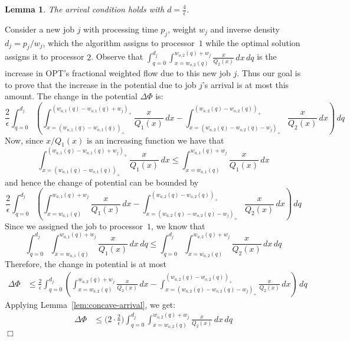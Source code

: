 \documentclass[11pt]{article}
\newtheorem{lemma}{Lemma}[section]
\newenvironment{proof}{\vspace{-0.15in}\noindent{\bf Proof:}}{\hspace*{\fill}$\Box$\par}
\newcommand{\opt}{\textrm{\sc OPT}\xspace}
\newcommand{\tsty}{}
\newcommand{\const}{\frac{2}{\epsilon}}
\begin{document}
\begin{lemma}
  \label{lem:arrival-wtd}
  The arrival condition holds with $d = \frac{4}{\epsilon}$.
\end{lemma}
\begin{proof}
Consider a new job $j$ with processing time $p_j$, weight $w_j$ and
inverse density $d_j = p_j/w_j$, which the algorithm assigns to
processor~$1$ while the optimal solution assigns it to processor $2$.
Observe that $\int_{q=0}^{d_j}
\int_{x=w_{o,2}(q)}^{w_{o,2}(q) + w_j} \frac{ x}{Q_2( x)} \,dx \,dq $ is
the increase in \opt's fractional weighted flow due to this new job $j$.
Thus our goal is to prove that the increase in the potential due to
job $j$'s arrival is at most this amount.
The change in the potential $\Delta \Phi$ is:
\begin{equation}
  \label{eq:phi1-wtd}
\nonumber \tsty \const \int_{q=0}^{d_j} \left( \int_{x= (w_{a,1}(q) -
    w_{o,1}(q))_{+}}^{(w_{a,1}(q) - w_{o,1}(q) + w_j)_+}
  \frac{x}{Q_1(x)} \,dx - \int_{x= (w_{a,2}(q) -
    w_{o,2}(q) -w_j)_+}^{(w_{a,2}(q) - w_{o,2}(q))_+} \frac{x}{Q_2(x)}
  \,dx  \right) \,dq
\end{equation}
Now, since $x/Q_1(x)$ is an increasing function we have that
\[
\tsty
\int_{x= (w_{a,1}(q) - w_{o,1}(q))_{+}}^{(w_{a,1}(q) - w_{o,1}(q) +
  w_j)_+} \frac{x}{Q_1(x)} \,dx \leq \int_{x= w_{a,1}(q)}^{w_{a,1}(q) +
  w_j} \frac{x}{Q_1(x)} \,dx
\]
and hence the change of potential can be bounded by
\[
\tsty \const \int_{q=0}^{d_j} \left( \int_{x= w_{a,1}(q)}^{w_{a,1}(q) +
  w_j} \frac{x}{Q_1(x)} \,dx - \int_{x= (w_{a,2}(q) -
  w_{o,2}(q)-w_j)_+}^{(w_{a,2}(q) - w_{o,2}(q))_+} \frac{x}{Q_2(x)}
\,dx \right) \,dq
\]
Since we assigned the job to processor~$1$, we know that
\[ \int_{q=0}^{d_j} \int_{x= w_{a,1}(q)}^{w_{a,1}(q) + w_j}
\frac{x}{Q_1(x)} \,dx\,dq \leq \int_{q=0}^{d_j} \int_{x=
  w_{a,2}(q)}^{w_{a,2}(q) + w_j} \frac{x}{Q_2(x)} \,dx\,dq
\]
Therefore, the change in potential is at most
\begin{align*}
  \Delta \Phi &\leq \tsty \const \int_{q=0}^{d_j} \left( \int_{x=
    w_{a,2}(q)}^{w_{a,2}(q) + w_j} \frac{x}{Q_2(x)} \,dx -
  \int_{x= (w_{a,2}(q) - w_{o,2}(q) - w_j)_+}^{(w_{a,2}(q) - w_{o,2}(q))_+} \frac{x}{Q_2(x)} \,dx  \right) \,dq
\end{align*}
Applying Lemma~\ref{lem:concave-arrival}, we get:
\begin{align*}
  \Delta \Phi & \leq \big( 2 \cdot \const \big) \int_{q=0}^{d_j}
  \int_{x=w_{o,2}(q)}^{w_{o,2}(q) + w_j} \frac{ x}{Q_2( x)} \,dx \,dq
\end{align*}
\end{proof}
\end{document}
